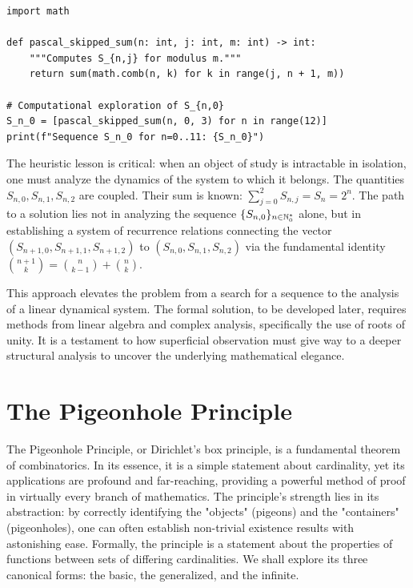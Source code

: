 \begin{verbatim}
import math

def pascal_skipped_sum(n: int, j: int, m: int) -> int:
    """Computes S_{n,j} for modulus m."""
    return sum(math.comb(n, k) for k in range(j, n + 1, m))

# Computational exploration of S_{n,0}
S_n_0 = [pascal_skipped_sum(n, 0, 3) for n in range(12)]
print(f"Sequence S_n_0 for n=0..11: {S_n_0}")
\end{verbatim}

The heuristic lesson is critical: when an object of study is intractable in isolation, one must analyze the dynamics of the system to which it belongs. The quantities $S_{n,0}, S_{n,1}, S_{n,2}$ are coupled. Their sum is known: $\sum_{j=0}^2 S_{n,j} = S_n = 2^n$. The path to a solution lies not in analyzing the sequence $\{S_{n,0}\}_{n \in \mathbb{N}_{0}^*}$ alone, but in establishing a system of recurrence relations connecting the vector $(S_{n+1,0}, S_{n+1,1}, S_{n+1,2})$ to $(S_{n,0}, S_{n,1}, S_{n,2})$ via the fundamental identity $\binom{n+1}{k} = \binom{n}{k-1} + \binom{n}{k}$.

This approach elevates the problem from a search for a sequence to the analysis of a linear dynamical system. The formal solution, to be developed later, requires methods from linear algebra and complex analysis, specifically the use of roots of unity. It is a testament to how superficial observation must give way to a deeper structural analysis to uncover the underlying mathematical elegance.

\section{The Pigeonhole Principle}

The Pigeonhole Principle, or Dirichlet's box principle, is a fundamental theorem of combinatorics. In its essence, it is a simple statement about cardinality, yet its applications are profound and far-reaching, providing a powerful method of proof in virtually every branch of mathematics. The principle's strength lies in its abstraction: by correctly identifying the "objects" (pigeons) and the "containers" (pigeonholes), one can often establish non-trivial existence results with astonishing ease. Formally, the principle is a statement about the properties of functions between sets of differing cardinalities. We shall explore its three canonical forms: the basic, the generalized, and the infinite.

